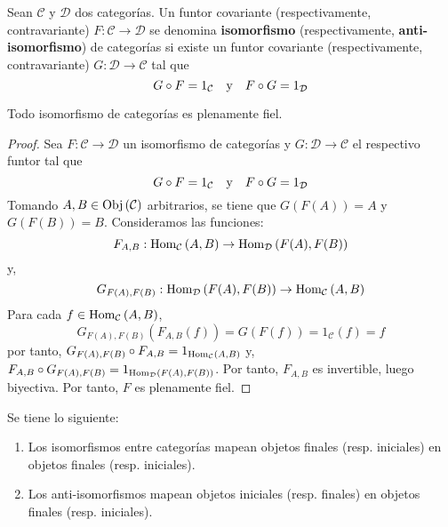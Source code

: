 \documentclass[12pt]{report}
\newcounter{it}
\theoremstyle{largebreak}
\newcommand\cf[3]{\ensuremath{#1:#2\rightarrow#3}}
\newcommand{\Obj}[1]{\ensuremath{\textup{Obj}\left(#1\right)}}
\newcommand{\Hom}[3]{\ensuremath{\textup{Hom}_{#1}\left(#2,#3\right)}}
\begin{document}
    \renewcommand{\theenumi}{\arabic{enumi}}
    
    \begin{mydef}
        Sean $\mathcal{C}$ y $\mathcal{D}$ dos categorías. Un funtor covariante (respectivamente, contravariante) $\cf{F}{\mathcal{C}}{\mathcal{D}}$ se denomina \textbf{isomorfismo} (respectivamente, \textbf{anti-isomorfismo}) de categorías si existe un funtor covariante (respectivamente, contravariante) $\cf{G}{\mathcal{D}}{\mathcal{C}}$ tal que
        \begin{equation*}
            G\circ F=1_{\mathcal{C}}\quad\textup{y}\quad F\circ G=1_{\mathcal{D}}
        \end{equation*}
    \end{mydef}

    \begin{propo}
        Todo isomorfismo de categorías es plenamente fiel.
    \end{propo}

    \begin{proof}
        Sea $\cf{F}{\mathcal{C}}{\mathcal{D}}$ un isomorfismo de categorías y $\cf{G}{\mathcal{D}}{\mathcal{C}}$ el respectivo funtor tal que
        \begin{equation*}
            G\circ F=1_{\mathcal{C}}\quad\textup{y}\quad F\circ G=1_{\mathcal{D}}
        \end{equation*}
        Tomando $A,B\in\Obj{\mathcal{C}}$ arbitrarios, se tiene que $G(F(A))=A$ y $G(F(B))=B$. Consideramos las funciones:
        \begin{equation*}
            \cf{F_{A,B}}{\Hom{\mathcal{C}}{A}{B}}{\Hom{\mathcal{D}}{F(A)}{F(B)}}
        \end{equation*}
        y,
        \begin{equation*}
            \cf{G_{F(A),F(B)}}{\Hom{\mathcal{D}}{F(A)}{F(B)}}{\Hom{\mathcal{C}}{A}{B}}
        \end{equation*}
        Para cada $f\in \Hom{\mathcal{C}}{A}{B}$,
        \begin{equation*}
            G_{F(A),F(B)}(F_{A,B}(f))=G(F(f))=1_{\mathcal{C}}(f)=f
        \end{equation*}
        por tanto, $G_{F(A),F(B)}\circ F_{A,B}=1_{\Hom{\mathcal{C}}{A}{B}}$ y, $F_{A,B}\circ G_{F(A),F(B)}=1_{\Hom{\mathcal{D}}{F(A)}{F(B)}}$. Por tanto, $F_{A,B}$ es invertible, luego biyectiva. Por tanto, $F$ es plenamente fiel.
    \end{proof}

    \begin{cor}
        Se tiene lo siguiente:
        \begin{enumerate}
            \item Los isomorfismos entre categorías mapean objetos finales (resp. iniciales) en objetos finales (resp. iniciales).
            \item Los anti-isomorfismos mapean objetos iniciales (resp. finales) en objetos finales (resp. iniciales).
        \end{enumerate}
    \end{cor}
\end{document}
